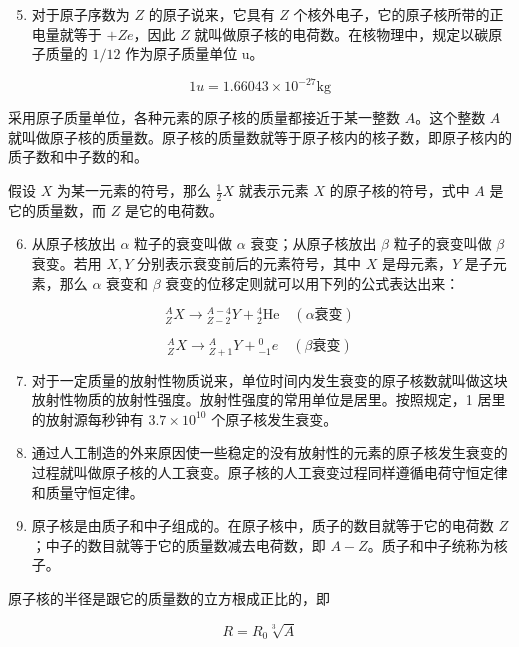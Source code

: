 \begin{enumerate}
\setcounter{enumi}{4}
\item
  对于原子序数为 \(Z\) 的原子说来，它具有 \(Z\)
  个核外电子，它的原子核所带的正电量就等于 \(+Ze\)，因此 \(Z\)
  就叫做原子核的电荷数。在核物理中，规定以碳原子质量的 \(1/12\)
  作为原子质量单位 u。
\end{enumerate}

\[
1 u = 1.66043 \times 10 ^ {-27} \mathrm{kg}
\]

采用原子质量单位，各种元素的原子核的质量都接近于某一整数 \(A\)。这个整数
\(A\)
就叫做原子核的质量数。原子核的质量数就等于原子核内的核子数，即原子核内的质子数和中子数的和。

假设 \(X\) 为某一元素的符号，那么 \(\frac{1}{2} X\) 就表示元素 \(X\)
的原子核的符号，式中 \(A\) 是它的质量数，而 \(Z\) 是它的电荷数。

\begin{enumerate}
\setcounter{enumi}{5}
\item
  从原子核放出 \(\alpha\) 粒子的衰变叫做 \(\alpha\) 衰变；从原子核放出
  \(\beta\) 粒子的衰变叫做 \(\beta\) 衰变。若用 \(X, Y\)
  分别表示衰变前后的元素符号，其中 \(X\) 是母元素，\(Y\) 是子元素，那么
  \(\alpha\) 衰变和 \(\beta\) 衰变的位移定则就可以用下列的公式表达出来：
\end{enumerate}

\[
{ } _ {Z}^{A}X\longrightarrow { } _ {Z-2}^{A-4}Y+{ } _ {2}^{4}\mathrm{He} \quad (\alpha \text{衰变})
\]

\[
{ } _ {Z}^{A}X\longrightarrow { } _ {Z+1}^{A}Y+{ } _ {-1}^{0}e \quad (\beta \text{衰变})
\]

\begin{enumerate}
\setcounter{enumi}{6}
\item
  对于一定质量的放射性物质说来，单位时间内发生衰变的原子核数就叫做这块放射性物质的放射性强度。放射性强度的常用单位是居里。按照规定，1
  居里的放射源每秒钟有 \(3.7 \times 10^{10}\) 个原子核发生衰变。
\item
  通过人工制造的外来原因使一些稳定的没有放射性的元素的原子核发生衰变的过程就叫做原子核的人工衰变。原子核的人工衰变过程同样遵循电荷守恒定律和质量守恒定律。
\item
  原子核是由质子和中子组成的。在原子核中，质子的数目就等于它的电荷数
  \(Z\)；中子的数目就等于它的质量数减去电荷数，即
  \(A - Z\)。质子和中子统称为核子。
\end{enumerate}

原子核的半径是跟它的质量数的立方根成正比的，即

\[
R = R _ {0} \sqrt [ 3 ]{A}
\]

